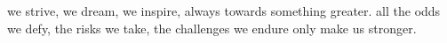 
\vspace*{7cm}
\begin{center}

we strive, we dream, we inspire, always towards something greater. all the odds we defy, the risks we take, the challenges we endure only make us stronger.
\end{center}



